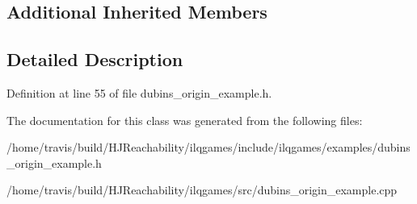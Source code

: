 \subsection*{Additional Inherited Members}


\subsection{Detailed Description}


Definition at line 55 of file dubins\+\_\+origin\+\_\+example.\+h.



The documentation for this class was generated from the following files\+:\begin{DoxyCompactItemize}
\item 
/home/travis/build/\+H\+J\+Reachability/ilqgames/include/ilqgames/examples/dubins\+\_\+origin\+\_\+example.\+h\item 
/home/travis/build/\+H\+J\+Reachability/ilqgames/src/dubins\+\_\+origin\+\_\+example.\+cpp\end{DoxyCompactItemize}
